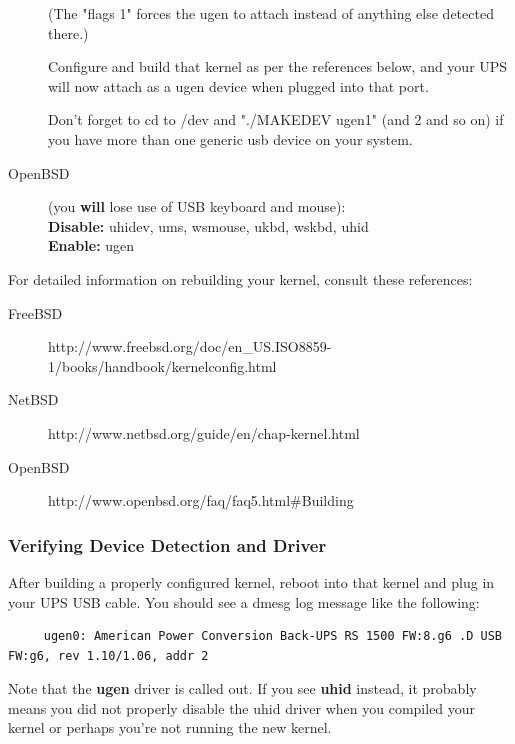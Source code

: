 \begin{description}
(The "flags 1" forces the ugen to attach instead of anything
else detected there.)

Configure and build that kernel as per the references below, and
your UPS will now attach as a ugen device when plugged into that
port.

Don't forget to cd to /dev and "./MAKEDEV ugen1" (and 2 and so
on) if you have more than one generic usb device on your system.

\item [OpenBSD] (you {\bf will} lose use of USB keyboard and mouse):
\\{\bf Disable:} uhidev, ums, wsmouse, ukbd, wskbd, uhid  
\\{\bf Enable:} ugen
\end{description}

For detailed information on rebuilding your kernel, consult these references: 

\begin{description}
\item [FreeBSD]
      {http://www.freebsd.org/doc/en\_US.ISO8859-1/books/handbook/kernelconfig.html}
\item [NetBSD]
      {http://www.netbsd.org/guide/en/chap-kernel.html}
\item [OpenBSD]
      {http://www.openbsd.org/faq/faq5.html\#Building}
\end{description}

\subsubsection*{Verifying Device Detection and Driver}

After building a properly configured kernel, reboot into that kernel and plug
in your UPS USB cable. You should see a dmesg log message like the following: 

\begin{verbatim}
     ugen0: American Power Conversion Back-UPS RS 1500 FW:8.g6 .D USB FW:g6, rev 1.10/1.06, addr 2
\end{verbatim}

Note that the {\bf ugen} driver is called out. If you see {\bf uhid} instead, it
probably means you did not properly disable the uhid driver when you compiled
your kernel or perhaps you're not running the new kernel.

